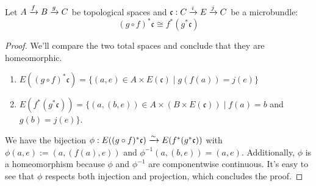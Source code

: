 \\ Let $A \xto{f} B \xto{g} C$ be topological spaces and $\mathfrak{c}: \bundle{C}{E}{i}{j}$ be a microbundle:
\[(g \circ f)^*\mathfrak{c} \cong f^*(g^*\mathfrak{c})\]
\begin{proof}
We'll compare the two total spaces and conclude that they are homeomorphic.
\begin{enumerate}
    \item $E((g \circ f)^*\mathfrak{c}) = \{ (a, e) \in A \times E(\mathfrak{c}) \mid g(f(a)) = j(e)\}$ 
    \item $E(f^*(g^*\mathfrak{c})) = \{ (a, (b, e)) \in A \times (B \times E(\mathfrak{c})) \mid f(a) = b$ and $ g(b) = j(e) \}$.
\end{enumerate}
We have the bijection $\phi: E((g \circ f)^*\mathfrak{c}) \isomto E(f^*(g^*\mathfrak{c}))$ with $\phi(a, e) := (a, (f(a), e))$ and $\phi^{-1}(a, (b, e)) = (a, e)$.
Additionally, $\phi$ is a homeomorphism because $\phi$ and $\phi^{-1}$ are componentwise continuous.
It's easy to see that $\phi$ respects both injection and projection, which concludes the proof.
\end{proof}